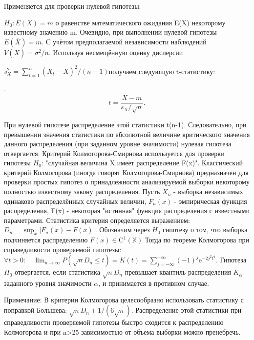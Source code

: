 \documentclass[a4paper, 12pt]{article}
\begin{document}
	Применяется для проверки нулевой гипотезы:
	
	$H_{0}:E(X)=m$ о равенстве математического ожидания 
	E(X) некоторому известному значению 
	m.
	Очевидно, при выполнении нулевой гипотезы 
	$E(\overline {X})=m.$ С учётом предполагаемой независимости наблюдений 	$V(\overline{X})=\sigma ^{2}/n$. Используя несмещённую оценку дисперсии 
	
	$s_{X}^{2}=\sum _{{t=1}}^{n}(X_{t}-\overline {X})^{2}/(n-1) $получаем следующую t-статистику:
	
	.
	$$ t={\frac {{\overline {X}}-m}{s_{X}/{\sqrt {n}}}}.$$
	
	При нулевой гипотезе распределение этой статистики 
	t(n-1). Следовательно, при превышении значения статистики по абсолютной величине критического значения данного распределения (при заданном уровне значимости) нулевая гипотеза отвергается.
	Критерий Колмогорова-Смирнова используется для проверки гипотезы $H_0$: "случайная величина X имеет распределение F(x)".
	Классический критерий Колмогорова (иногда говорят Колмогорова-Смирнова) предназначен для проверки простых гипотез о принадлежности анализируемой выборки некоторому полностью известному закону распределения.
	Пусть $X_n$ - выборка независимых одинаково распределённых случайных величин, $F_n(x)$ - эмпирическая функция распределения, F(x) - некоторая "истинная" функция распределения с известными параметрами. Статистика критерия определяется выражением:
	$D_n=\sup_x |F_n(x)-F(x)|.$
	Обозначим через $H_0$ гипотезу о том, что выборка подчиняется распределению $F(x)\in \mathrm{C}^1(\mathbb{X})$ Тогда по теореме Колмогорова при справедливости проверяемой гипотезы:
	$\forall t>0: \quad \lim_{n \to \infty}P(\sqrt{n} D_n \leq t)=K(t)=\sum_{j=-\infty}^{+\infty}(-1)^j \mathrm{e}^{-2j^2t^2}.$
	Гипотеза $H_0$ отвергается, если статистика $\sqrt{n}D_n\!$ превышает квантиль распределения $K_\alpha$ заданного уровня значимости $\alpha$, и принимается в противном случае.
	
	Примечание: В критерии Колмогорова целесообразно использовать статистику с поправкой Большева: $\sqrt{n}D_n+1/(6\sqrt{n})$. Распределение этой статистики при справедливости проверяемой гипотезы быстро сходится к распределению Колмогорова и при  n>25   зависимостью от объема выборки можно пренебречь.
	
\end{document}
